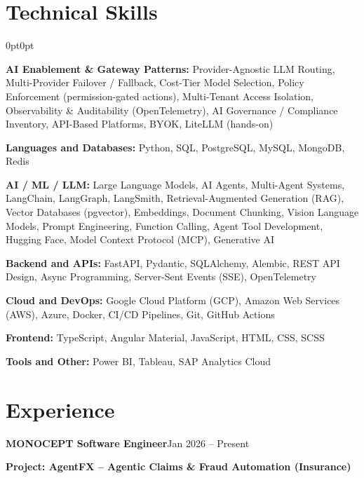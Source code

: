 \documentclass[10pt, letterpaper]{article}
\newenvironment{onecolentry}{
    \begin{adjustwidth}{0pt}{0pt}
}{
    \end{adjustwidth}
}
\newcommand{\headerrow}[2]{%
    \noindent\textbf{#1}\hfill #2\par%
}
\begin{document}
\section{Technical Skills}
\begin{onecolentry}
\textbf{AI Enablement \& Gateway Patterns:} Provider-Agnostic LLM Routing, Multi-Provider Failover / Fallback, Cost-Tier Model Selection, Policy Enforcement (permission-gated actions), Multi-Tenant Access Isolation, Observability \& Auditability (OpenTelemetry), AI Governance / Compliance Inventory, API-Based Platforms, BYOK, LiteLLM (hands-on)

\vspace{3pt}
\textbf{Languages and Databases:} Python, SQL, PostgreSQL, MySQL, MongoDB, Redis

\vspace{3pt}
\textbf{AI / ML / LLM:} Large Language Models, AI Agents, Multi-Agent Systems, LangChain, LangGraph, LangSmith, Retrieval-Augmented Generation (RAG), Vector Databases (pgvector), Embeddings, Document Chunking, Vision Language Models, Prompt Engineering, Function Calling, Agent Tool Development, Hugging Face, Model Context Protocol (MCP), Generative AI

\vspace{3pt}
\textbf{Backend and APIs:} FastAPI, Pydantic, SQLAlchemy, Alembic, REST API Design, Async Programming, Server-Sent Events (SSE), OpenTelemetry

\vspace{3pt}
\textbf{Cloud and DevOps:} Google Cloud Platform (GCP), Amazon Web Services (AWS), Azure, Docker, CI/CD Pipelines, Git, GitHub Actions

\vspace{3pt}
\textbf{Frontend:} TypeScript, Angular Material, JavaScript, HTML, CSS, SCSS

\vspace{3pt}
\textbf{Tools and Other:} Power BI, Tableau, SAP Analytics Cloud
\end{onecolentry}

\section{Experience}

\headerrow{MONOCEPT \textbar{} Software Engineer}{Jan 2026 -- Present}
\headerrow{Project: AgentFX -- Agentic Claims \& Fraud Automation (Insurance)}{}
\end{document}
